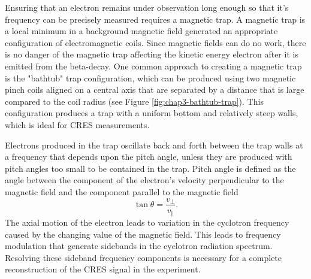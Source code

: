 Ensuring that an electron remains under observation long enough so that it's frequency can be precisely measured requires a magnetic trap. A magnetic trap is a local minimum in a background magnetic field generated an appropriate configuration of electromagnetic coils. Since magnetic fields can do no work, there is no danger of the magnetic trap affecting the kinetic energy electron after it is emitted from the beta-decay. One common approach to creating a magnetic trap is the "bathtub" trap configuration, which can be produced using two magnetic pinch coils aligned on a central axis that are separated by a distance that is large compared to the coil radius (see Figure \ref{fig:chap3-bathtub-trap}). This configuration produces a trap with a uniform bottom and relatively steep walls, which is ideal for CRES measurements. 

Electrons produced in the trap oscillate back and forth between the trap walls at a frequency that depends upon the pitch angle, unless they are produced with pitch angles too small to be contained in the trap. Pitch angle is defined as the angle between the component of the electron's velocity perpendicular to the magnetic field and the component parallel to the magnetic field
\begin{equation}
    \tan{\theta}=\frac{v_\perp}{v_\parallel}.
\end{equation}
The axial motion of the electron leads to variation in the cyclotron frequency caused by the changing value of the magnetic field. This leads to frequency modulation that generate sidebands in the cyclotron radiation spectrum. Resolving these sideband frequency components is necessary for a complete reconstruction of the CRES signal in the experiment.

